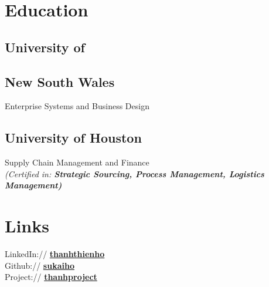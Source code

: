 \documentclass[letterpaper]{deedy-resume} %
\begin{document}
\begin{minipage}[t]{0.33\textwidth} %


\section{Education} 

\subsection{University of}
\subsection{New South Wales}

Enterprise Systems and Business Design\\

\sectionspace %

\subsection{University of Houston}
Supply Chain Management and Finance \\
{\footnotesize \textit{(Certified in:\textbf{ Strategic Sourcing, Process Management, Logistics Management)}}} \\

\sectionspace %




\section{Links} 

LinkedIn:// \href{https://www.linkedin.com/in/thanhthienho}{\bf thanhthienho} \\
Github:// \href{https://github.com/sukaiho}{\bf sukaiho} \\
Project:// \href{https://drive.google.com/folderview?id=0B7mZbJb-qiSURlYyTkJzQW43aWs&usp=sharing}{\bf thanhproject} \\



\end{minipage}
\end{document}
